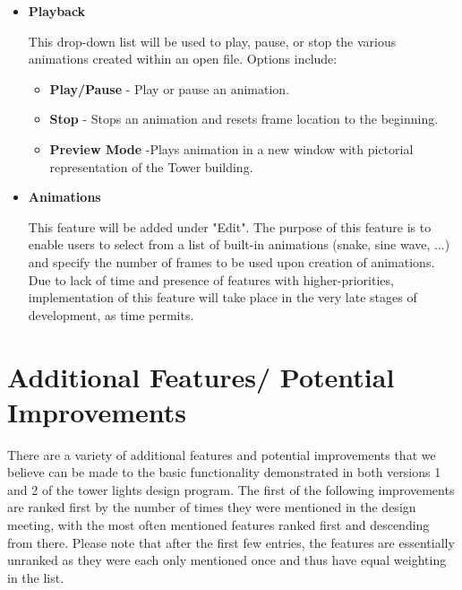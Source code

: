 \documentclass[12pt]{extarticle}
\begin{document}
\begin{itemize}
{This option will enable users to search for a specific frame by label or frame number.  Again, this is an additional feature to be added as time permits.}

\item \textbf{Playback}

{This drop-down list will be used to play, pause, or stop the various animations created within an open file. Options include: }
	\begin{itemize}
	\item \textbf{Play/Pause} - Play or pause an animation.
	\item \textbf{Stop} - Stops an animation and resets frame location to the beginning.
	\item \textbf{Preview Mode} -Plays animation in a new window with pictorial representation of the Tower building.

	\end{itemize}

\item \textbf{Animations}

{This feature will be added under "Edit". The purpose of this feature is to enable users to select from a list of built-in animations (snake, sine wave, ...) and specify the number of frames to be used upon creation of animations. Due to lack of time and presence of features with higher-priorities, implementation of this feature will take place in the very late stages of development, as time permits. }

\end{itemize}

\clearpage
\section{Additional Features/ Potential Improvements}
{There are a variety of additional features and potential improvements that we believe can be made to the basic functionality demonstrated in both versions 1 and 2 of the tower lights design program. The first of the following improvements are ranked first by the number of times they were mentioned in the design meeting, with the most often mentioned features ranked first and descending from there. Please note that after the first few entries, the features are essentially unranked as they were each only mentioned once and thus have equal weighting in the list.}
\end{document}
